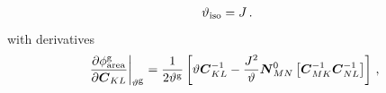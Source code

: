 \documentclass[10pt,letterpaper,oneside]{report}
\newcommand{\ten}[1]{\mbox{\boldmath $#1$}{}}
\newcommand{\scas}[1]{\mbox{{\scriptsize{${\rm{#1}}$}}}{}}
\newcommand{\tens}[1]{\mbox{\boldmath{\scriptsize{$#1$}}}{}}
\begin{document}
\begin{itemize}
\begin{align}
\vartheta_{\scas{iso}} ={}& J \, . 
\end{align}
with derivatives
\begin{align}
\left. \frac{ \partial \phi^{\scas{g}}_{\scas{area}} }{ \partial \ten{C}_{KL} } \right|_{\vartheta^{\scas{g}}} 
={}& \frac{1}{2 \vartheta^{\scas{g}}} \left[ \vartheta \ten{C}^{-1}_{KL} - \frac{J^2}{\vartheta} \ten{N}^0_{MN} \left[ \ten{C}^{-1}_{MK} \ten{C}^{-1}_{NL} \right] \right] \, , 
\\

\end{align}
\end{itemize}
\end{document}
